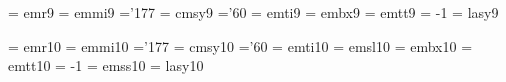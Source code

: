  
 \font\ninrm  = emr9               %
 \font\ninmi  = emmi9              %
    \skewchar\ninmi ='177          %
 \font\ninsy  = cmsy9              %
    \skewchar\ninsy ='60           %
 \font\ninit  = emti9              %
 \font\ninbf  = embx9              %
 \font\nintt  = emtt9              %
    \hyphenchar\nintt = -1         %
 \font\ninly  = lasy9             %
 
 \font\tenrm  = emr10    %
 \font\tenmi  = emmi10   %
    \skewchar\tenmi ='177  %
 \font\tensy  = cmsy10   %
    \skewchar\tensy ='60 %
 \font\tenit  = emti10   %
 \font\tensl  = emsl10   %
 \font\tenbf  = embx10   %
 \font\tentt  = emtt10   %
    \hyphenchar\tentt = -1         %
 \font\tensf  = emss10   %
 \font\tenly  = lasy10  %
 
